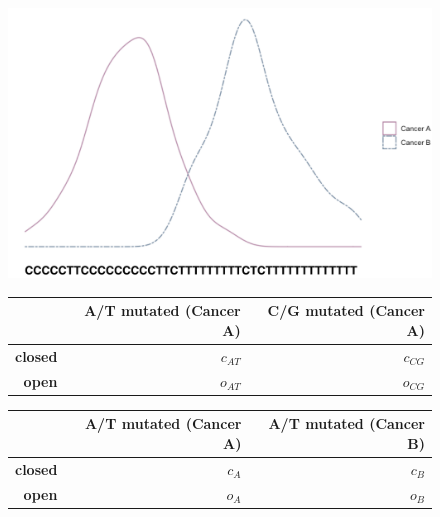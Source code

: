 \begin{figure}[ht!]
  \begin{minipage}[c]{\textwidth}
    \includegraphics[scale=0.9]{graphics/discussion_gle.pdf}
  \end{minipage}\hfill
  \vspace{1cm}
  
  \begin{minipage}[c]{0.48\textwidth}
  \centering
    \begin{tabulary}{\columnwidth}{rRR}
    \toprule
        & \textbf{A/T mutated (Cancer A)} &  \textbf{C/G mutated (Cancer A)} \\
    \hline
        \textbf{closed} & $c_{AT}$ &  $c_{CG}$ \\
        \textbf{open} & $o_{AT}$ & $o_{CG}$  \\
    \bottomrule
    \end{tabulary}
  \end{minipage}\hfill
  \begin{minipage}[c]{0.48\textwidth}
    \begin{tabulary}{\columnwidth}{rRR}
    \toprule
        & \textbf{A/T mutated (Cancer A)} &  \textbf{A/T mutated (Cancer B)} \\
    \hline
        \textbf{closed} & $c_{A}$ &  $c_{B}$ \\
        \textbf{open} & $o_{A}$ & $o_{B}$  \\
    \bottomrule
    \end{tabulary}
  \end{minipage}
  \vspace{0.8cm}
  

\end{figure}
